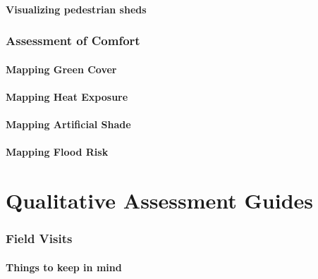 \documentclass[
]{latex/krantz}
\begin{document}
\hypertarget{visualizing-pedestrian-sheds}{%
\subsection{Visualizing pedestrian sheds}\label{visualizing-pedestrian-sheds}}

\hypertarget{assessment-of-comfort}{%
\section{Assessment of Comfort}\label{assessment-of-comfort}}

\hypertarget{mapping-green-cover}{%
\subsection{Mapping Green Cover}\label{mapping-green-cover}}

\hypertarget{mapping-heat-exposure}{%
\subsection{Mapping Heat Exposure}\label{mapping-heat-exposure}}

\hypertarget{mapping-artificial-shade}{%
\subsection{Mapping Artificial Shade}\label{mapping-artificial-shade}}

\hypertarget{mapping-flood-risk}{%
\subsection{Mapping Flood Risk}\label{mapping-flood-risk}}

\hypertarget{part-qualitative-assessment-guides}{%
\part{Qualitative Assessment Guides}\label{part-qualitative-assessment-guides}}

\hypertarget{field-visits}{%
\section{Field Visits}\label{field-visits}}

\hypertarget{things-to-keep-in-mind}{%
\subsection{Things to keep in mind}\label{things-to-keep-in-mind}}
\end{document}
